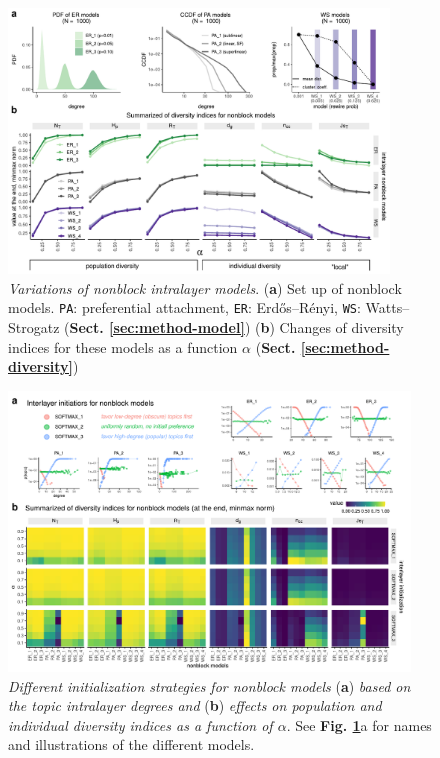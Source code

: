 \documentclass{svproc}
\begin{document}
\begin{figure}[!ht]
    \centering
    \includegraphics[width=0.9\textwidth]{FigS1.pdf}
    \caption{
    \textit{Variations of nonblock intralayer models}.
    (\textbf{a}) Set up of nonblock models. \texttt{PA}: preferential attachment, \texttt{ER}: Erdős–Rényi, \texttt{WS}: Watts–Strogatz (\textbf{Sect. \ref{sec:method-model}})
    (\textbf{b}) Changes of diversity indices for these models as a function $\alpha$ (\textbf{Sect. \ref{sec:method-diversity}})
    }
    \label{supp:1}
\end{figure}

\begin{figure}[!ht]
    \centering
    \includegraphics[width=0.95\textwidth]{FigS2.pdf}
    \caption{
    \textit{Different initialization strategies for nonblock models} (\textbf{a}) \textit{based on the topic intralayer degrees and }(\textbf{b}) \textit{effects on population and individual diversity indices as a function of $\alpha$}. See \textbf{Fig. \ref{supp:1}}a for names and illustrations of the different models.
    }
    \label{supp:2}
\end{figure}
\end{document}
